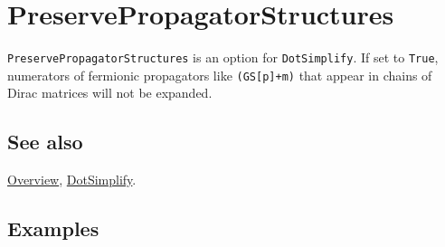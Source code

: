 \documentclass[../FeynCalcManual.tex]{subfiles}
\begin{document}
\hypertarget{preservepropagatorstructures}{%
\section{PreservePropagatorStructures}\label{preservepropagatorstructures}}

\texttt{PreservePropagatorStructures} is an option for
\texttt{DotSimplify}. If set to \texttt{True}, numerators of fermionic
propagators like \texttt{(GS[\allowbreak{}p]+m)} that appear in chains
of Dirac matrices will not be expanded.

\subsection{See also}

\hyperlink{toc}{Overview}, \hyperlink{dotsimplify}{DotSimplify}.

\subsection{Examples}
\end{document}

